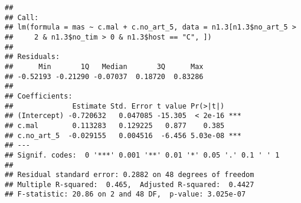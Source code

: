 \documentclass[]{article}
\newenvironment{Shaded}{\begin{snugshade}}{\end{snugshade}}
\newcommand{\KeywordTok}[1]{\textcolor[rgb]{0.13,0.29,0.53}{\textbf{#1}}}
\newcommand{\DataTypeTok}[1]{\textcolor[rgb]{0.13,0.29,0.53}{#1}}
\newcommand{\DecValTok}[1]{\textcolor[rgb]{0.00,0.00,0.81}{#1}}
\newcommand{\StringTok}[1]{\textcolor[rgb]{0.31,0.60,0.02}{#1}}
\newcommand{\CommentTok}[1]{\textcolor[rgb]{0.56,0.35,0.01}{\textit{#1}}}
\newcommand{\OtherTok}[1]{\textcolor[rgb]{0.56,0.35,0.01}{#1}}
\newcommand{\OperatorTok}[1]{\textcolor[rgb]{0.81,0.36,0.00}{\textbf{#1}}}
\newcommand{\NormalTok}[1]{#1}
\begin{document}
\begin{Shaded}
\end{Shaded}

\begin{verbatim}
## 
## Call:
## lm(formula = mas ~ c.mal + c.no_art_5, data = n1.3[n1.3$no_art_5 > 
##     2 & n1.3$no_tim > 0 & n1.3$host == "C", ])
## 
## Residuals:
##      Min       1Q   Median       3Q      Max 
## -0.52193 -0.21290 -0.07037  0.18720  0.83286 
## 
## Coefficients:
##              Estimate Std. Error t value Pr(>|t|)    
## (Intercept) -0.720632   0.047085 -15.305  < 2e-16 ***
## c.mal        0.113283   0.129225   0.877    0.385    
## c.no_art_5  -0.029155   0.004516  -6.456 5.03e-08 ***
## ---
## Signif. codes:  0 '***' 0.001 '**' 0.01 '*' 0.05 '.' 0.1 ' ' 1
## 
## Residual standard error: 0.2882 on 48 degrees of freedom
## Multiple R-squared:  0.465,  Adjusted R-squared:  0.4427 
## F-statistic: 20.86 on 2 and 48 DF,  p-value: 3.025e-07
\end{verbatim}
\end{document}
